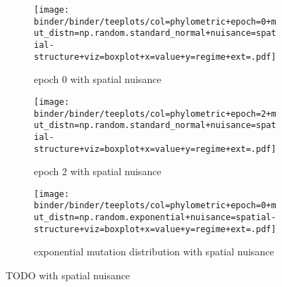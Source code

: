 \begin{figure*}
  \centering
  \begin{subfigure}[b]{\textwidth}
    \centering
    \texttt{[image: binder/binder/teeplots/col=phylometric+epoch=0+mut\_distn=np.random.standard\_normal+nuisance=spatial-structure+viz=boxplot+x=value+y=regime+ext=.pdf]}
    \caption{%
      epoch 0 with spatial nuisance}
    \label{fig:perfect-tree-phylometrics-sensitivity-analysis-with-spatial-nuisance:epoch0}
  \end{subfigure}
  \begin{subfigure}[b]{\textwidth}
    \centering
    \texttt{[image: binder/binder/teeplots/col=phylometric+epoch=2+mut\_distn=np.random.standard\_normal+nuisance=spatial-structure+viz=boxplot+x=value+y=regime+ext=.pdf]}
    \caption{%
      epoch 2 with spatial nuisance}
    \label{fig:perfect-tree-phylometrics-sensitivity-analysis-with-spatial-nuisance:epoch2}
  \end{subfigure}
  \begin{subfigure}[b]{\textwidth}
    \centering
    \texttt{[image: binder/binder/teeplots/col=phylometric+epoch=0+mut\_distn=np.random.exponential+nuisance=spatial-structure+viz=boxplot+x=value+y=regime+ext=.pdf]}
    \caption{%
      exponential mutation distribution with spatial nuisance}
    \label{fig:perfect-tree-phylometrics-sensitivity-analysis-with-spatial-nuisance:exponential}
  \end{subfigure}
  \caption{%
    TODO with spatial nuisance}
  \label{fig:perfect-tree-phylometrics-sensitivity-analysis-with-spatial-nuisance}
\end{figure*}

